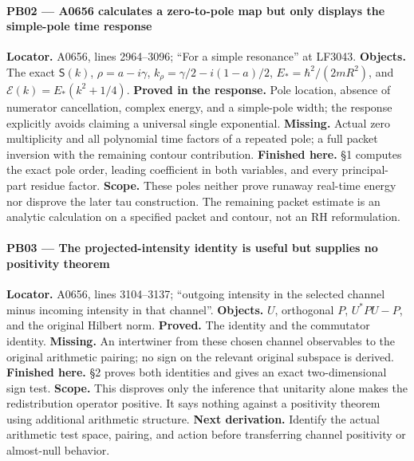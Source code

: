 \documentclass[10pt,a4paper,oneside]{report}
\begin{document}
\paragraph{PB02 --- A0656 calculates a zero-to-pole map but only
displays the simple-pole time
response}\label{pb02-a0656-calculates-a-zero-to-pole-map-but-only-displays-the-simple-pole-time-response}

\textbf{Locator.} A0656, lines 2964--3096; ``For a simple resonance'' at
LF3043. \textbf{Objects.} The exact \(\mathsf S(k)\),
\(\rho=a-i\gamma\), \(k_\rho=\gamma/2-i(1-a)/2\),
\(E_*=\hbar^2/(2mR^2)\), and \(\mathcal E(k)=E_*(k^2+1/4)\).
\textbf{Proved in the response.} Pole location, absence of numerator
cancellation, complex energy, and a simple-pole width; the response
explicitly avoids claiming a universal single exponential.
\textbf{Missing.} Actual zero multiplicity and all polynomial time
factors of a repeated pole; a full packet inversion with the remaining
contour contribution. \textbf{Finished here.}
\protect{} §1 computes the exact pole order, leading
coefficient in both variables, and every principal-part residue factor.
\textbf{Scope.} These poles neither prove runaway real-time energy nor
disprove the later tau construction. The remaining packet estimate is an
analytic calculation on a specified packet and contour, not an RH
reformulation.

\paragraph{PB03 --- The projected-intensity identity is useful but
supplies no positivity
theorem}\label{pb03-the-projected-intensity-identity-is-useful-but-supplies-no-positivity-theorem}

\textbf{Locator.} A0656, lines 3104--3137; ``outgoing intensity in the
selected channel minus incoming intensity in that channel''.
\textbf{Objects.} \(U\), orthogonal \(P\), \(U^*PU-P\), and the original
Hilbert norm. \textbf{Proved.} The
\protect{} identity and the
commutator identity. \textbf{Missing.} An intertwiner from these chosen
channel observables to the original arithmetic pairing; no sign on the
relevant original subspace is derived. \textbf{Finished here.}
\protect{} §2 proves both identities and gives an
exact two-dimensional sign test. \textbf{Scope.} This disproves only the
inference that unitarity alone makes the redistribution operator
positive. It says nothing against a positivity theorem using additional
arithmetic structure. \textbf{Next derivation.} Identify the actual
arithmetic test space, pairing, and action before transferring channel
positivity or almost-null behavior.
\end{document}

